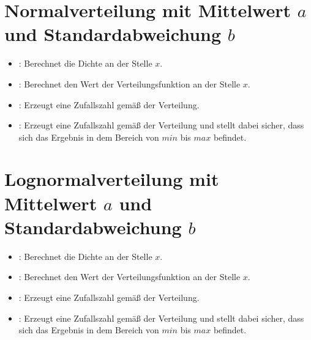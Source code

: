 \section{Normalverteilung mit Mittelwert \texorpdfstring{$a$}{a} und Standardabweichung \texorpdfstring{$b$}{b}}

\begin{itemize}

\item
{}:
Berechnet die Dichte an der Stelle $x$.

\item
{}:
Berechnet den Wert der Verteilungsfunktion an der Stelle $x$.

\item
{}:
Erzeugt eine Zufallszahl gemäß der Verteilung.

\item
{}:
Erzeugt eine Zufallszahl gemäß der Verteilung und stellt dabei sicher, dass sich das Ergebnis in dem Bereich von $min$ bis $max$ befindet.

\end{itemize}



\section{Lognormalverteilung mit Mittelwert \texorpdfstring{$a$}{a} und Standardabweichung \texorpdfstring{$b$}{b}}

\begin{itemize}

\item
{}:
Berechnet die Dichte an der Stelle $x$.

\item
{}:
Berechnet den Wert der Verteilungsfunktion an der Stelle $x$.

\item
{}:
Erzeugt eine Zufallszahl gemäß der Verteilung.

\item
{}:
Erzeugt eine Zufallszahl gemäß der Verteilung und stellt dabei sicher, dass sich das Ergebnis in dem Bereich von $min$ bis $max$ befindet.

\end{itemize}



